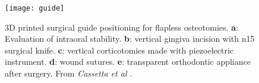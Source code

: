 \begin{figure}[h]
\vspace{-10pt}
	\begin{center}
	\texttt{[image: guide]}
    \caption{3D printed surgical guide positioning for flapless osteotomies. \textbf{a}: Evaluation of intraoral stability. \textbf{b}: vertical gingiva incision with n15 surgical knife. \textbf{c}: vertical corticotomies made with piezoelectric instrument. \textbf{d}: wound sutures. \textbf{e}: transparent orthodontic appliance after surgery. From \emph{Cassetta et al} \parencite{Reference114}.}
    \label{fig:guide}
	\end{center}
\vspace{-20pt}
\end{figure}

 
 